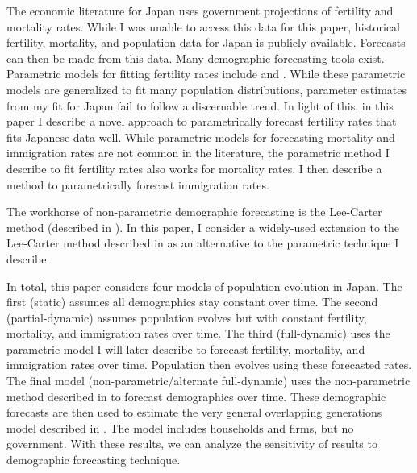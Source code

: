 \documentclass[10pt]{article}
\numberwithin{equation}{subsection}
\begin{document}

\par The economic literature for Japan uses government projections of fertility and mortality rates. While I was unable to access this data for this paper, historical fertility, mortality, and population data for Japan is publicly available. Forecasts can then be made from this data. Many demographic forecasting tools exist. Parametric models for fitting fertility rates include \cite{HDFSB2019} and \cite{MS2011}. While these parametric models are generalized to fit many population distributions, parameter estimates from my fit for Japan fail to follow a discernable trend. In light of this, in this paper I describe a novel approach to parametrically forecast fertility rates that fits Japanese data well. While parametric models for forecasting mortality and immigration rates are not common in the literature, the parametric method I describe to fit fertility rates also works for mortality rates. I then describe a method to parametrically forecast immigration rates.

\par The workhorse of non-parametric demographic forecasting is the Lee-Carter method (described in \cite{GK2007}). In this paper, I consider a widely-used extension to the Lee-Carter method described in \cite{alt_demo_paper} as an alternative to the parametric technique I describe.

\par In total, this paper considers four models of population evolution in Japan. The first (static) assumes all demographics stay constant over time. The second (partial-dynamic) assumes population evolves but with constant fertility, mortality, and immigration rates over time. The third (full-dynamic) uses the parametric model I will later describe to forecast fertility, mortality, and immigration rates over time. Population then evolves using these forecasted rates. The final model (non-parametric/alternate full-dynamic) uses the non-parametric method described in \cite{alt_demo_paper} to forecast demographics over time. These demographic forecasts are then used to estimate the very general overlapping generations model described in \cite{E2020}. The model includes households and firms, but no government. With these results, we can analyze the sensitivity of results to demographic forecasting technique.
\end{document}
